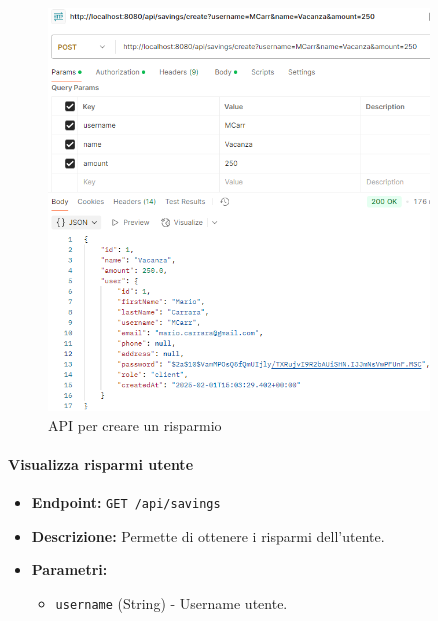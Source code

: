 \begin{figure}[H]
    \centering
    \includegraphics[width=0.9\textwidth]{images/CreateSavingAPI.png}
    \caption{API per creare un risparmio}
    \label{fig: CreateSavingAPI}
\end{figure}

\paragraph{Visualizza risparmi utente} 

\begin{itemize}
    \item \textbf{Endpoint:} \texttt{GET /api/savings}
    \item \textbf{Descrizione:} Permette di ottenere i risparmi dell'utente.
    \item \textbf{Parametri:}
    \begin{itemize}
        \item \texttt{username} (String) - Username utente.
    \end{itemize}
\end{itemize}

